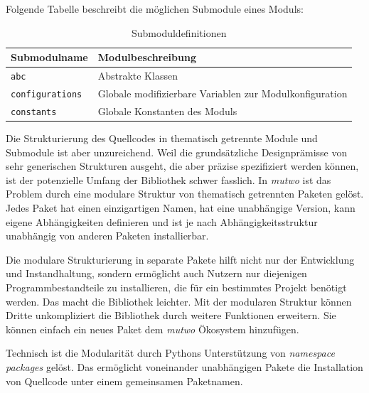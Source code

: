 \documentclass[12pt,a4paper,ngerman]{article}
\begin{document}
Folgende Tabelle beschreibt die möglichen Submodule eines Moduls:

\begin{table}[H]
    \begin{center}
        \begin{tabular}{l l} 
            \hline
            Submodulname & Modulbeschreibung \\ [0.5ex] 
            \hline\hline
            \texttt{abc} & Abstrakte Klassen \\  %
            \texttt{configurations} & Globale modifizierbare Variablen zur Modulkonfiguration \\
            \texttt{constants} & Globale Konstanten des Moduls \\
            \hline
        \end{tabular}
    \end{center}

    \caption{Submoduldefinitionen}
\end{table}

Die Strukturierung des Quellcodes in thematisch getrennte Module und Submodule ist aber unzureichend.
Weil die grundsätzliche Designprämisse von sehr generischen Strukturen ausgeht, die aber präzise spezifiziert werden können, ist der potenzielle Umfang der Bibliothek schwer fasslich.
In \emph{mutwo} ist das Problem durch eine modulare Struktur von thematisch getrennten Paketen gelöst.
Jedes Paket hat einen einzigartigen Namen, hat eine unabhängige Version, kann eigene Abhängigkeiten definieren und ist je nach Abhängigkeitsstruktur unabhängig von anderen Paketen installierbar.

\bigskip

Die modulare Strukturierung in separate Pakete hilft nicht nur der Entwicklung und Instandhaltung, sondern ermöglicht auch Nutzern nur diejenigen Programmbestandteile zu installieren, die für ein bestimmtes Projekt benötigt werden.
Das macht die Bibliothek leichter.
Mit der modularen Struktur können Dritte unkompliziert die Bibliothek durch weitere Funktionen erweitern.
Sie können einfach ein neues Paket dem \emph{mutwo} Ökosystem hinzufügen.

\bigskip

Technisch ist die Modularität durch Pythons Unterstützung von \emph{namespace packages} gelöst.
Das ermöglicht voneinander unabhängigen Pakete die Installation von Quellcode unter einem gemeinsamen Paketnamen.

\bigskip
\end{document}
